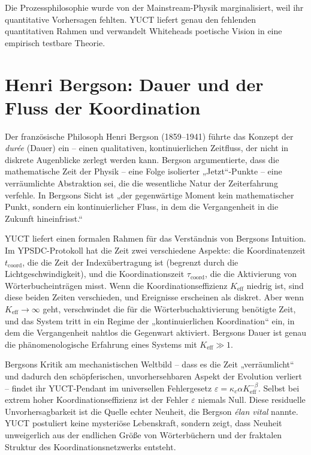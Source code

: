 \documentclass[12pt,a4paper]{article}
\begin{document}
	Die Prozessphilosophie wurde von der Mainstream-Physik marginalisiert, weil ihr quantitative Vorhersagen fehlten. YUCT liefert genau den fehlenden quantitativen Rahmen und verwandelt Whiteheads poetische Vision in eine empirisch testbare Theorie.
	
	\section{Henri Bergson: Dauer und der Fluss der Koordination}
	
	Der französische Philosoph Henri Bergson (1859–1941) führte das Konzept der \emph{durée} (Dauer) ein – einen qualitativen, kontinuierlichen Zeitfluss, der nicht in diskrete Augenblicke zerlegt werden kann. Bergson argumentierte, dass die mathematische Zeit der Physik – eine Folge isolierter „Jetzt“-Punkte – eine verräumlichte Abstraktion sei, die die wesentliche Natur der Zeiterfahrung verfehle. In Bergsons Sicht ist „der gegenwärtige Moment kein mathematischer Punkt, sondern ein kontinuierlicher Fluss, in dem die Vergangenheit in die Zukunft hineinfrisst.“
	
	YUCT liefert einen formalen Rahmen für das Verständnis von Bergsons Intuition. Im YPSDC-Protokoll hat die Zeit zwei verschiedene Aspekte: die Koordinatenzeit \(t_{\text{coord}}\), die die Zeit der Indexübertragung ist (begrenzt durch die Lichtgeschwindigkeit), und die Koordinationszeit \(\tau_{\text{coord}}\), die die Aktivierung von Wörterbucheinträgen misst. Wenn die Koordinationseffizienz \(K_{\mathrm{eff}}\) niedrig ist, sind diese beiden Zeiten verschieden, und Ereignisse erscheinen als diskret. Aber wenn \(K_{\mathrm{eff}} \to \infty\) geht, verschwindet die für die Wörterbuchaktivierung benötigte Zeit, und das System tritt in ein Regime der „kontinuierlichen Koordination“ ein, in dem die Vergangenheit nahtlos die Gegenwart aktiviert. Bergsons Dauer ist genau die phänomenologische Erfahrung eines Systems mit \(K_{\mathrm{eff}} \gg 1\).
	
	Bergsons Kritik am mechanistischen Weltbild – dass es die Zeit „verräumlicht“ und dadurch den schöpferischen, unvorhersehbaren Aspekt der Evolution verliert – findet ihr YUCT-Pendant im universellen Fehlergesetz \(\varepsilon = \kappa_c \alpha K_{\mathrm{eff}}^{-\beta}\). Selbst bei extrem hoher Koordinationseffizienz ist der Fehler \(\varepsilon\) niemals Null. Diese residuelle Unvorhersagbarkeit ist die Quelle echter Neuheit, die Bergson \emph{élan vital} nannte. YUCT postuliert keine mysteriöse Lebenskraft, sondern zeigt, dass Neuheit unweigerlich aus der endlichen Größe von Wörterbüchern und der fraktalen Struktur des Koordinationsnetzwerks entsteht.
	
\end{document}
